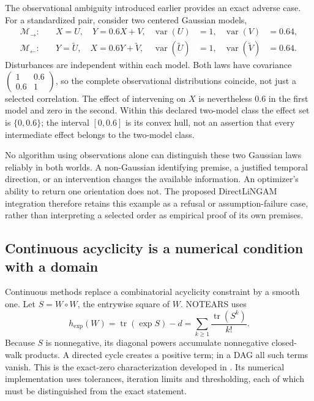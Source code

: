 The observational ambiguity introduced earlier provides an exact adverse case.
For a standardized pair, consider two centered Gaussian models,
\begin{align}
 \mathcal M_{\to}:&\quad X=U,\quad Y=0.6X+V,
     &\operatorname{var}(U)&=1,&\operatorname{var}(V)&=0.64,\\
 \mathcal M_{\leftarrow}:&\quad Y=\widetilde U,\quad X=0.6Y+\widetilde V,
     &\operatorname{var}(\widetilde U)&=1,&\operatorname{var}(\widetilde V)&=0.64.
\end{align}
Disturbances are independent within each model. Both laws have covariance
\(\left(\begin{smallmatrix}1&0.6\\0.6&1\end{smallmatrix}\right)\), so the
complete observational distributions coincide, not just a selected correlation.
The effect of intervening on \(X\) is nevertheless \(0.6\) in the first model
and zero in the second. Within this declared two-model class the effect set is
\(\{0,0.6\}\); the interval \([0,0.6]\) is its convex hull, not an assertion
that every intermediate effect belongs to the two-model class.

No algorithm using observations alone can distinguish these two Gaussian laws
reliably in both worlds. A non-Gaussian identifying premise, a justified
temporal direction, or an intervention changes the available information.
An optimizer's ability to return one orientation does not. The proposed
DirectLiNGAM integration therefore retains this example as a refusal or
assumption-failure case, rather than interpreting a selected order as empirical
proof of its own premises.

\subsection{Continuous acyclicity is a numerical condition with a domain}

Continuous methods replace a combinatorial acyclicity constraint by a smooth
one. Let \(S=W\circ W\), the entrywise square of \(W\). NOTEARS uses
\begin{equation}
 h_{\exp}(W)=\operatorname{tr}(\exp S)-d
             =\sum_{k\geq1}\frac{\operatorname{tr}(S^k)}{k!}.
\end{equation}
Because \(S\) is nonnegative, its diagonal powers accumulate nonnegative
closed-walk products. A directed cycle creates a positive term; in a DAG all
such terms vanish. This is the exact-zero characterization developed in
\citet{notears2018}. Its numerical implementation uses tolerances, iteration
limits and thresholding, each of which must be distinguished from the exact
statement.

